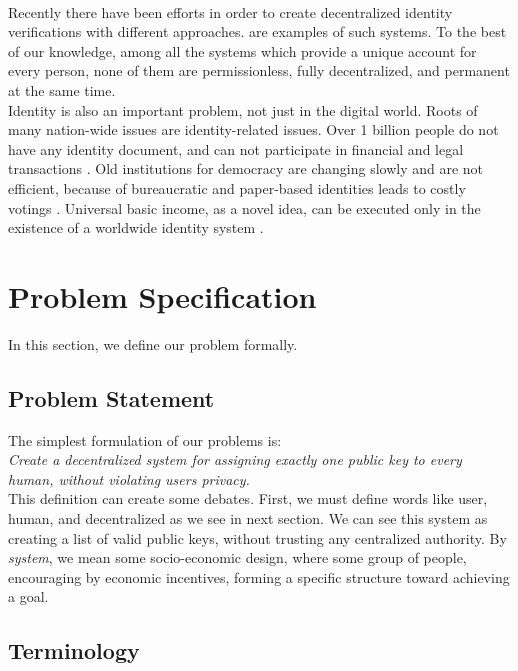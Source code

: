 \documentclass[conference]{IEEEtran}
\begin{document}
\\
Recently there have been efforts in order to create decentralized identity verifications with different approaches. \cite{proofofpersonhood, uport, sovrin} are examples of such systems. To the best of our knowledge, among all the systems which provide a unique account for every person, none of them are permissionless, fully decentralized, and permanent at the same time.
\\
Identity is also an important problem, not just in the digital world. Roots of many nation-wide issues are identity-related issues. Over 1 billion people do not have any identity document, and can not participate in financial and legal transactions \cite{worldbankid}. Old institutions for democracy are changing slowly and are not efficient, because of bureaucratic and paper-based identities leads to costly votings \cite{democracyearth}. Universal basic income, as a novel idea, can be executed only in the existence of a worldwide identity system \cite{basicincome}.




\section{ Problem Specification}
In this section, we define our problem formally.

\subsection{Problem Statement}
The simplest formulation of our problems is: \\
\textit{Create a decentralized system for assigning exactly one public key to every human, without violating users privacy. }
\\
This definition can create some debates. First, we must define words like user, human, and decentralized as we see in next section. We can see this system as creating a list of valid public keys, without trusting any centralized authority. By \textit{system}, we mean some socio-economic design, where some group of people, encouraging by economic incentives, forming a specific structure toward achieving a goal. 

\subsection{Terminology}
\end{document}
